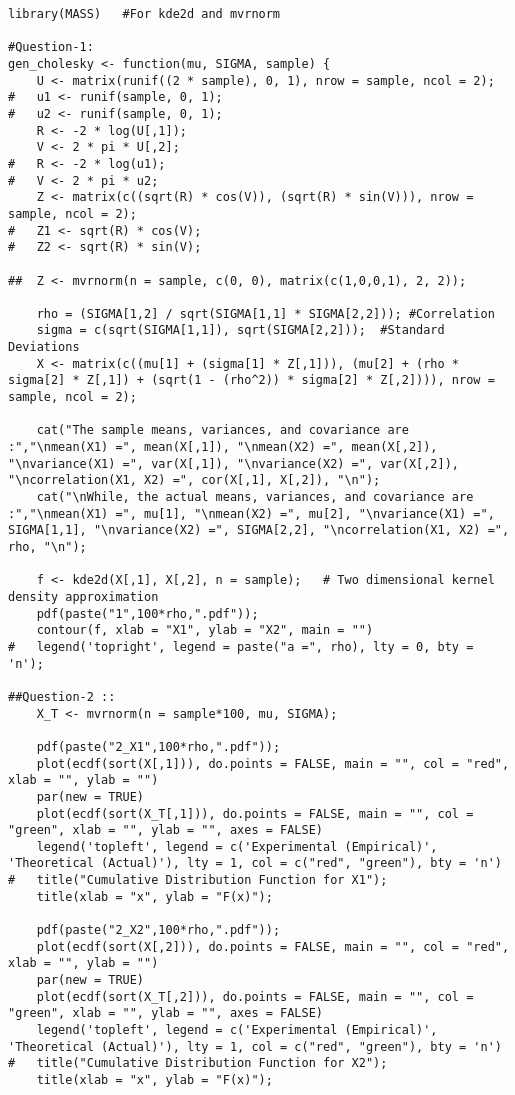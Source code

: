 \documentclass[11pt]{article}
\begin{document}
\begin{lstlisting}
library(MASS)	#For kde2d and mvrnorm

#Question-1:
gen_cholesky <- function(mu, SIGMA, sample) {
	U <- matrix(runif((2 * sample), 0, 1), nrow = sample, ncol = 2);
#	u1 <- runif(sample, 0, 1);
#	u2 <- runif(sample, 0, 1);
	R <- -2 * log(U[,1]);
	V <- 2 * pi * U[,2];
#	R <- -2 * log(u1);
#	V <- 2 * pi * u2;
	Z <- matrix(c((sqrt(R) * cos(V)), (sqrt(R) * sin(V))), nrow = sample, ncol = 2);
#	Z1 <- sqrt(R) * cos(V);
#	Z2 <- sqrt(R) * sin(V);

##	Z <- mvrnorm(n = sample, c(0, 0), matrix(c(1,0,0,1), 2, 2));

	rho = (SIGMA[1,2] / sqrt(SIGMA[1,1] * SIGMA[2,2]));	#Correlation
	sigma = c(sqrt(SIGMA[1,1]), sqrt(SIGMA[2,2]));	#Standard Deviations
	X <- matrix(c((mu[1] + (sigma[1] * Z[,1])), (mu[2] + (rho * sigma[2] * Z[,1]) + (sqrt(1 - (rho^2)) * sigma[2] * Z[,2]))), nrow = sample, ncol = 2);

	cat("The sample means, variances, and covariance are :","\nmean(X1) =", mean(X[,1]), "\nmean(X2) =", mean(X[,2]), "\nvariance(X1) =", var(X[,1]), "\nvariance(X2) =", var(X[,2]), "\ncorrelation(X1, X2) =", cor(X[,1], X[,2]), "\n");
	cat("\nWhile, the actual means, variances, and covariance are :","\nmean(X1) =", mu[1], "\nmean(X2) =", mu[2], "\nvariance(X1) =", SIGMA[1,1], "\nvariance(X2) =", SIGMA[2,2], "\ncorrelation(X1, X2) =", rho, "\n");

	f <- kde2d(X[,1], X[,2], n = sample);	# Two dimensional kernel density approximation
	pdf(paste("1",100*rho,".pdf"));
	contour(f, xlab = "X1", ylab = "X2", main = "")
#	legend('topright', legend = paste("a =", rho), lty = 0, bty = 'n');

##Question-2 ::
	X_T <- mvrnorm(n = sample*100, mu, SIGMA);

	pdf(paste("2_X1",100*rho,".pdf"));
	plot(ecdf(sort(X[,1])), do.points = FALSE, main = "", col = "red", xlab = "", ylab = "")
	par(new = TRUE)
	plot(ecdf(sort(X_T[,1])), do.points = FALSE, main = "", col = "green", xlab = "", ylab = "", axes = FALSE)
	legend('topleft', legend = c('Experimental (Empirical)', 'Theoretical (Actual)'), lty = 1, col = c("red", "green"), bty = 'n')
#	title("Cumulative Distribution Function for X1");
	title(xlab = "x", ylab = "F(x)");

	pdf(paste("2_X2",100*rho,".pdf"));
	plot(ecdf(sort(X[,2])), do.points = FALSE, main = "", col = "red", xlab = "", ylab = "")
	par(new = TRUE)
	plot(ecdf(sort(X_T[,2])), do.points = FALSE, main = "", col = "green", xlab = "", ylab = "", axes = FALSE)
	legend('topleft', legend = c('Experimental (Empirical)', 'Theoretical (Actual)'), lty = 1, col = c("red", "green"), bty = 'n')
#	title("Cumulative Distribution Function for X2");
	title(xlab = "x", ylab = "F(x)");


\end{lstlisting}
\end{document}
